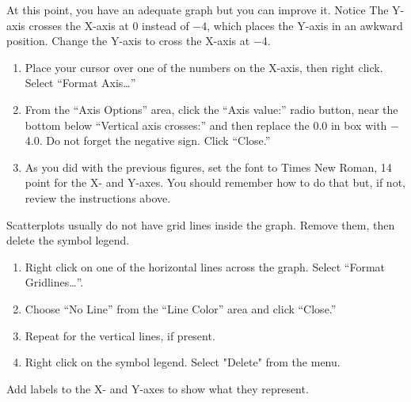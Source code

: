 \documentclass[12pt, hidelinks]{exam}
\begin{document}
At this point, you have an adequate graph but you can improve it. Notice The Y-axis crosses the X-axis at 0 instead of $-$4, which places the Y-axis in an awkward position. Change the Y-axis to cross the X-axis at $-$4.

\begin{enumerate}[resume]
	\item Place your cursor over one of the numbers on the X-axis, then right click. Select “Format Axis\dots”

	\item From the “Axis Options” area, click the “Axis value:” radio button, near the bottom below “Vertical axis crosses:” and then replace the 0.0 in box with $-$4.0. Do not forget the negative sign. Click “Close.” 

	\item As you did with the previous figures, set the font to Times New Roman, 14 point for the X- and Y-axes. You should remember how to do that but, if not, review the instructions above.
\end{enumerate}

Scatterplots usually do not have grid lines inside the graph. Remove them, then delete the symbol legend.

\begin{enumerate}[resume]
	\item Right click on one of the horizontal lines across the graph. Select “Format Gridlines\dots”.

	\item Choose “No Line” from the “Line Color” area and click “Close.”

	\item Repeat for the vertical lines, if present.
	
	\item Right click on the symbol legend. Select "Delete" from the menu.
\end{enumerate}

Add labels to the X- and Y-axes to show what they represent.
\end{document}
